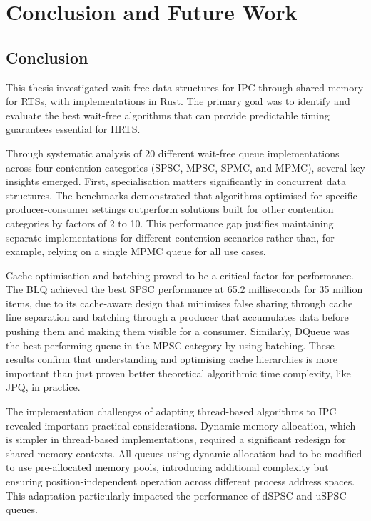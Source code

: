 \chapter{Conclusion and Future Work}\label{ch:conclusion}

\section{Conclusion}

This thesis investigated wait-free data structures for \ac{IPC} through shared memory for \acsp{RTS}, with implementations in Rust. The primary goal was to identify and evaluate the best wait-free algorithms that can provide predictable timing guarantees essential for \ac{HRTS}.

Through systematic analysis of 20 different wait-free queue implementations across four contention categories (\ac{SPSC}, \ac{MPSC}, \ac{SPMC}, and \ac{MPMC}), several key insights emerged. First, specialisation matters significantly in concurrent data structures. The benchmarks demonstrated that algorithms optimised for specific producer-consumer settings outperform solutions built for other contention categories by factors of 2 to 10. This performance gap justifies maintaining separate implementations for different contention scenarios rather than, for example, relying on a single \ac{MPMC} queue for all use cases.

Cache optimisation and batching proved to be a critical factor for performance. The \acf{BLQ} achieved the best \ac{SPSC} performance at 65.2 milliseconds for 35 million items, due to its cache-aware design that minimises false sharing through cache line separation and batching through a producer that accumulates data before pushing them and making them visible for a consumer. Similarly, DQueue was the best-performing queue in the \ac{MPSC} category by using batching. These results confirm that understanding and optimising cache hierarchies is more important than just proven better theoretical algorithmic time complexity, like \ac{JPQ}, in practice.

The implementation challenges of adapting thread-based algorithms to \ac{IPC} revealed important practical considerations. Dynamic memory allocation, which is simpler in thread-based implementations, required a significant redesign for shared memory contexts. All queues using dynamic allocation had to be modified to use pre-allocated memory pools, introducing additional complexity but ensuring position-independent operation across different process address spaces. This adaptation particularly impacted the performance of \ac{dSPSC} and \ac{uSPSC} queues.


